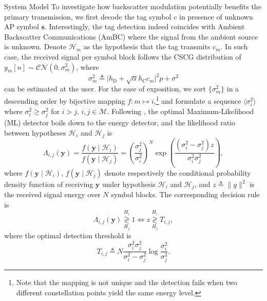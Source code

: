 \documentclass[journal]{IEEEtran}
\begin{document}
\begin{section}{System Model}
		To investigate how backscatter modulation potentially benefits the primary transmission, we first decode the tag symbol $c$ in presence of unknown AP symbol $\boldsymbol{s}$. Interestingly, the tag detection indeed coincides with Ambient Backscatter Communications (AmBC) where the signal from the ambient source is unknown. Denote $\mathcal{H}_m$ as the hypothesis that the tag transmits $c_m$. In such case, the received signal per symbol block follows the CSCG distribution of $y_m[n] \sim \mathcal{CN}(0,\sigma_m^2)$, where
		\begin{equation}
			\sigma_m^2 \triangleq \lvert h_{\mathrm{D}} + \sqrt{\alpha} h_{\mathrm{C}} c_m \rvert^2 p + \sigma^2
		\end{equation}
		can be estimated at the user. For the ease of exposition, we sort $\{\sigma_m^2\}$ in a descending order by bijective mapping $f \colon m \mapsto i$,\footnote{Note that the mapping is not unique and the detection fails when two different constellation points yield the same energy level.} and formulate a sequence $\langle \sigma_i^2 \rangle$ where $\sigma_i^2 \ge \sigma_j^2$ for $i > j$, $i,j \in \mathcal{M}$. Following \cite{Qian2019}, the optimal Maximum-Likelihood (ML) detector boils down to the energy detector, and the likelihood ratio between hypotheses $\mathcal{H}_i$ and $\mathcal{H}_j$ is
		\begin{equation}
			\Lambda_{i, j}(\boldsymbol{y}) = \frac{f(\boldsymbol{y} \mid \mathcal{H}_i)}{f(\boldsymbol{y} \mid \mathcal{H}_j)} = \left( \frac{\sigma_j^2}{\sigma_i^2} \right)^N \exp \left( \frac{(\sigma_i^2 - \sigma_j^2) z}{\sigma_i^2 \sigma_j^2} \right),
		\end{equation}
		where $f(\boldsymbol{y} \mid \mathcal{H}_i)$, $f(\boldsymbol{y} \mid \mathcal{H}_j)$ denote respectively the conditional probability density function of receiving $\boldsymbol{y}$ under hypothesis $\mathcal{H}_i$ and $\mathcal{H}_j$, and $z \triangleq \lVert y \rVert^2$ is the received signal energy over $N$ symbol blocks. The corresponding decision rule is
		\begin{equation}
			\Lambda_{i, j}(\boldsymbol{y}) \underset{H_j}{\overset{H_i}{\gtrless}} 1 \iff z \underset{H_j}{\overset{H_i}{\gtrless}} T_{i, j},
		\end{equation}
		where the optimal detection threshold is
		\begin{equation}
			T_{i, j} \triangleq N \frac{\sigma_i^2 \sigma_j^2}{\sigma_i^2 - \sigma_j^2} \log \frac{\sigma_i^2}{\sigma_j^2}.
		\end{equation}

\end{section}
\end{document}
